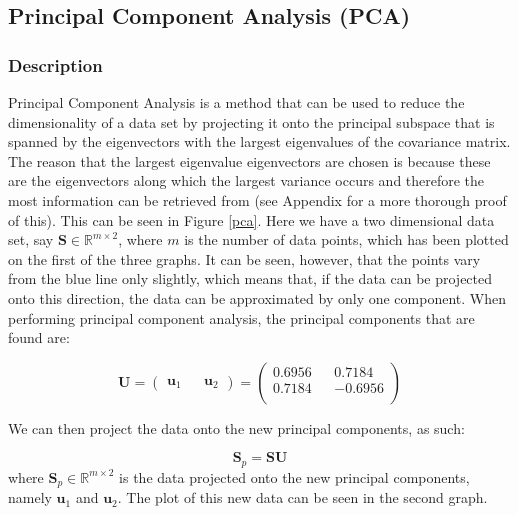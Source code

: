 \documentclass[11pt,a4paper]{article}
\begin{document}



\subsection{Principal Component Analysis (PCA)}
\subsubsection{Description}
Principal Component Analysis is a method that can be used to reduce the dimensionality of a data set by projecting it onto the principal subspace that is spanned by the eigenvectors with the largest eigenvalues of the covariance matrix. The reason that the largest eigenvalue eigenvectors are chosen is because these are the eigenvectors along which the largest variance occurs and therefore the most information can be retrieved from (see Appendix for a more thorough proof of this). This can be seen in Figure \ref{pca}. Here we have a two dimensional data set, say $\mathbf{S} \in \mathbb{R}^{m \times 2}$, where $m$ is the number of data points, which has been plotted on the first of the three graphs. It can be seen, however, that the points vary from the blue line only slightly, which means that, if the data can be projected onto this direction, the data can be approximated by only one component. When performing principal component analysis, the principal components that are found are:

\begin{equation*}
\mathbf{U} = 
\begin{pmatrix}
\mathbf{u}_1 && \mathbf{u}_2
\end{pmatrix} = 
\begin{pmatrix}
0.6956 && 0.7184\\
 0.7184 && -0.6956\\

\end{pmatrix}
\end{equation*}

We can then project the data onto the new principal components, as such:

\begin{equation*}
\mathbf{S}_p = \mathbf{S}\mathbf{U}
\end{equation*}
where $\mathbf{S}_p \in \mathbb{R}^{m \times 2}$ is the data projected onto the new principal components, namely $\mathbf{u}_1$ and $\mathbf{u}_2$. The plot of this new data can be seen in the second graph. 
\end{document}
